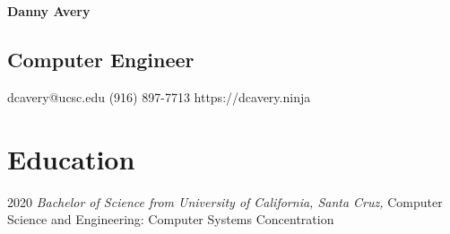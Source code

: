 \documentclass[12pt,letterpaper]{report}
\newcommand{\myname}{Danny Avery}
\newcommand{\namefont}[1]{{\normalfont\bfseries\Huge{#1}}}
\newcommand{\middlegap}{3.5em}
\newcommand{\verticalgap}{2em}
\newcommand{\degreegap}{1.9em}
\newcommand{\leftbody}{0.69\linewidth}
\newcommand{\rightcolumn}{0.21\linewidth}
\newcommand{\topandbottom}{\linewidth}
\begin{document}
	\raggedright
	\begin{minipage}[t]{\leftbody}
	\namefont{\myname}
	\vspace{\degreegap}
	\subsection*{Computer Engineer} 
	\end{minipage}
	\hspace{\middlegap}
	\begin{minipage}[t]{\rightcolumn}
		dcavery@ucsc.edu \newline
		(916) 897-7713\newline
		https://dcavery.ninja
	\end{minipage}
	\begin{minipage}[t]{\topandbottom}
	\vspace{\verticalgap}
	\section*{Education}
	\begin{tablist}
		\item[2020] \tab  \textit{Bachelor of Science from University of California, Santa Cruz,} \newline 
		 Computer Science and Engineering: Computer Systems Concentration 
	\end{tablist}	
	\end{minipage}
%
\end{document}
